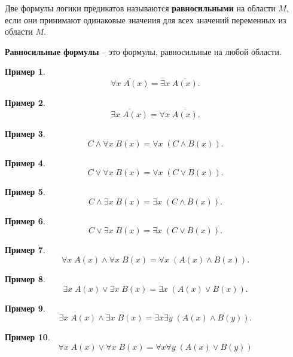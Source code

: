 \documentclass[a5paper, 11pt]{extarticle}
\theoremstyle{definition}
\newtheorem{example}{Пример}[subsection]
\theoremstyle{definition}
\theoremstyle{definition}
\numberwithin{figure}{section}
\numberwithin{table}{section}
\begin{document}
Две формулы логики предикатов называются \textbf{равносильными} на области \(M\), если они принимают одинаковые значения для всех значений переменных из области \(M\).

\textbf{Равносильные формулы} -- это формулы, равносильные на любой области.

\begin{example}
    \[
        \overline{\forall x \; A(x)} = \exists x \; \overline{A(x)}.
    \]
\end{example}

\begin{example}
    \[
        \overline{\exists x \; A(x)} = \forall x \; \overline{A(x)}.
    \]
\end{example}

\begin{example}
    \[
        C \land \forall x \; B(x) = \forall x \; (C \land B(x)).
    \]
\end{example}

\begin{example}
    \[
        C \lor \forall x \; B(x) = \forall x \; (C \lor B(x)).
    \]
\end{example}

\begin{example}
    \[
        C \land \exists x \; B(x) = \exists x \; (C \land B(x)).
    \]
\end{example}

\begin{example}
    \[
        C \lor \exists x \; B(x) = \exists x \; (C \lor B(x)).
    \]
\end{example}

\begin{example}
    \[
        \forall x \; A(x) \land \forall x \; B(x) = \forall x \; (A(x) \land B(x)).
    \]
\end{example}

\begin{example}
    \[
        \exists x \; A(x) \lor \exists x \; B(x) = \exists x \; (A(x) \lor B(x)).
    \]
\end{example}

\begin{example}
    \[
        \exists x \; A(x) \land \exists x \; B(x) = \exists x \exists y \; (A(x) \land B(y)).
    \]
\end{example}

\begin{example}
    \[
        \forall x \; A(x) \lor \forall x \; B(x) = \forall x \forall y \; (A(x) \lor B(y))
    \]
\end{example}
\end{document}
